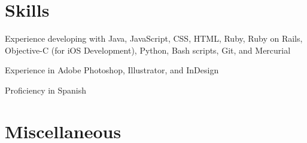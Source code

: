 \documentclass[10pt,letterpaper]{article}
\renewenvironment{itemize}{
  \begin{list}{}{
    \setlength{\leftmargin}{1.5em}
    \setlength{\itemsep}{0.25em}
    \setlength{\parskip}{0pt}
    \setlength{\parsep}{0.25em}
  }
}{
  \end{list}
}
\begin{document}


\section*{Skills}

\begin{itemize}
    \item Experience developing with Java, JavaScript, CSS, HTML, Ruby, Ruby on Rails,
    Objective-C (for iOS Development), Python, Bash scripts, Git, and Mercurial
    \item Experience in Adobe Photoshop, Illustrator, and InDesign
    \item Proficiency in Spanish
\end{itemize}

\section*{Miscellaneous}
\end{document}
